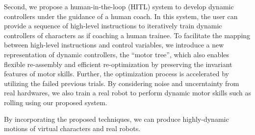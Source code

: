 \begin{summary}
  Second, we propose a human-in-the-loop (HITL) system to develop dynamic
  controllers under the guidance of a human coach.
  In this system, the user can provide a sequence of high-level instructions
  to iteratively train dynamic controllers of characters 
  as if coaching a human trainee.
  To facilitate the mapping between high-level instructions and
  control variables, we introduce a new representation of dynamic controllers,
  the ``motor tree'', which also enables flexible re-assembly and 
  efficient re-optimization by preserving the invariant features
  of motor skills.
  Further, the optimization process is accelerated by 
  utilizing the failed previous trials.
  By considering noise and uncerntainty from real hardwares,
  we also train a real robot to perform dynamic motor skills 
  such as rolling using our proposed system.

  By incorporating the proposed techniques, we can produce highly-dynamic motions 
  of virtual characters and real robots.


\end{summary}
